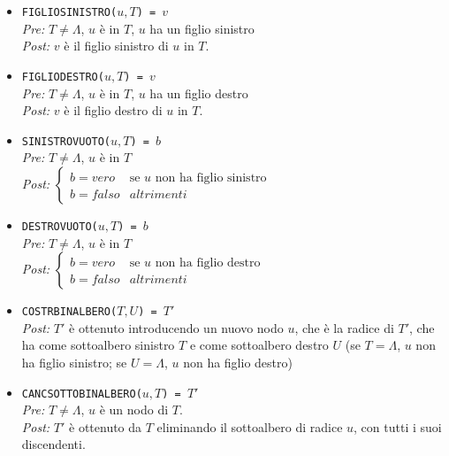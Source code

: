 \documentclass[12pt]{report}
\begin{document}
  	\begin{itemize}
  		\item \texttt{FIGLIOSINISTRO($u, T$) = $v$} \\
  		\quad \textit{Pre:} $T \neq \Lambda$, $u$ è in $T$, $u$ ha un figlio sinistro \\
  		\quad \textit{Post:} $v$ è il figlio sinistro di $u$ in $T$.

  		\item \texttt{FIGLIODESTRO($u, T$) = $v$} \\
  		\quad \textit{Pre:} $T \neq \Lambda$, $u$ è in $T$, $u$ ha un figlio destro \\
  		\quad \textit{Post:} $v$ è il figlio destro di $u$ in $T$.

  		\item \texttt{SINISTROVUOTO($u, T$) = $b$} \\
  		\quad \textit{Pre:} $T \neq \Lambda$, $u$ è in $T$ \\
  		\quad \textit{Post:} $\begin{cases}
  			b = vero & \text{se } u \text{ non ha figlio sinistro} \\
  			b = falso & altrimenti
  		\end{cases}$

  		\item \texttt{DESTROVUOTO($u, T$) = $b$} \\
  		\quad \textit{Pre:} $T \neq \Lambda$, $u$ è in $T$\\
  		\quad \textit{Post:} $\begin{cases}
  			b = vero & \text{se } u \text{ non ha figlio destro} \\
  			b = falso & altrimenti
  		\end{cases}$

  		\item \texttt{COSTRBINALBERO($T, U$) = $T'$} \\
  		\quad \textit{Post:} $T'$ è ottenuto introducendo un nuovo nodo $u$, che è la radice di $T'$, che ha come sottoalbero sinistro $T$ e come sottoalbero destro $U$ (se $T = \Lambda$, $u$ non ha figlio sinistro; se $U = \Lambda$, $u$ non ha figlio destro)
  		\item \texttt{CANCSOTTOBINALBERO($u, T$) = $T'$} \\
  		\quad \textit{Pre:} $T \neq \Lambda$, $u$ è un nodo di $T$.\\
  		\quad \textit{Post:} $T'$ è ottenuto da $T$ eliminando il sottoalbero di radice $u$, con tutti i suoi discendenti.
  	\end{itemize}
\end{document}
